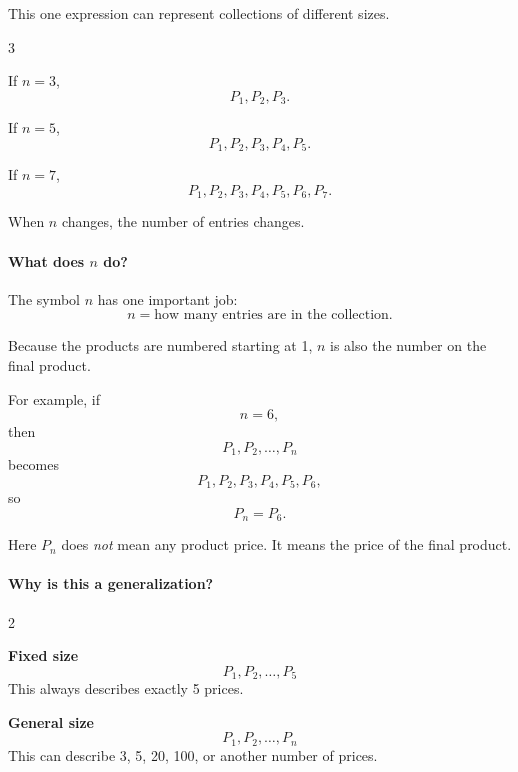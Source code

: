 	This one expression can represent collections of different sizes.
	
	{
		\setlength{\columnseprule}{0.4pt}
		\setlength{\columnsep}{1.5em}
		\begin{multicols}{3}
			
			If $n=3$,
			\[
			P_1,P_2,P_3.
			\]
			
			\columnbreak
			
			If $n=5$,
			\[
			P_1,P_2,P_3,P_4,P_5.
			\]
			
			\columnbreak
			
			If $n=7$,
			\[
			P_1,P_2,P_3,P_4,P_5,P_6,P_7.
			\]
			
		\end{multicols}
	}
	
	When $n$ changes, the number of entries changes.
	
	\paragraph{What does $n$ do?}
	
	The symbol $n$ has one important job:
	\[
	\boxed{n=\text{how many entries are in the collection}.}
	\]
	
	Because the products are numbered starting at 1, $n$ is also the number on the final product.
	
	For example, if
	\[
	n=6,
	\]
	then
	\[
	P_1,P_2,\ldots,P_n
	\]
	becomes
	\[
	P_1,P_2,P_3,P_4,P_5,P_6,
	\]
	so
	\[
	P_n=P_6.
	\]
	
	Here $P_n$ does \emph{not} mean any product price. It means the price of the final product.
	
	\paragraph{Why is this a generalization?}
	
	{
		\setlength{\columnseprule}{0.4pt}
		\setlength{\columnsep}{1.5em}
		\begin{multicols}{2}
			
			\textbf{Fixed size}
			\[
			P_1,P_2,\ldots,P_5
			\]
			This always describes exactly 5 prices.
			
			\columnbreak
			
			\textbf{General size}
			\[
			P_1,P_2,\ldots,P_n
			\]
			This can describe 3, 5, 20, 100, or another number of prices.
			
		\end{multicols}
	}
	
